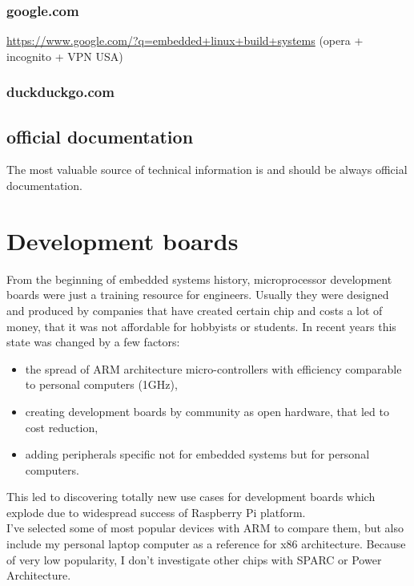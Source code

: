 \documentclass[printmode]{mgr}
\begin{document}
\subsection{google.com}

\url{https://www.google.com/?q=embedded+linux+build+systems} (opera + incognito + VPN USA)

\subsection{duckduckgo.com}

\section{official documentation}

The most valuable source of technical information is and should be always official documentation.

\chapter{Development boards}
\label{chapter:development-boards}

From the beginning of embedded systems history, microprocessor development boards were just a training resource for engineers.
Usually they were designed and produced by companies that have created certain chip and costs a lot of money, that it was not affordable for hobbyists or students.
In recent years this state was changed by a few factors:
\begin{itemize}
  \item the spread of ARM architecture micro-controllers with efficiency comparable to personal computers (1GHz),
  \item creating development boards by community as open hardware, that led to cost reduction,
  \item adding peripherals specific not for embedded systems but for personal computers.
\end{itemize}
This led to discovering totally new use cases for development boards which explode due to widespread success of Raspberry Pi platform. \\
I've selected some of most popular devices with ARM to compare them, but also include my personal laptop computer as a reference for x86 architecture. Because of very low popularity, I don't investigate other chips with SPARC or Power Architecture. \\
\end{document}
